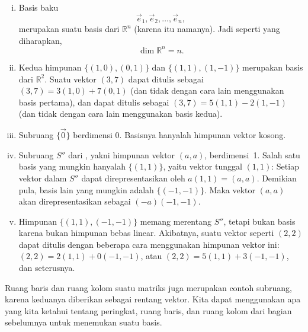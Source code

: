 \begin{example}
\begin{enumerate}[(i)]
\item
Basis baku
\begin{equation*}
\vec{e}_1, \vec{e}_2, \ldots, \vec{e}_n ,
\end{equation*}
merupakan suatu basis dari ${\mathbb R}^n$ (karena itu namanya).
Jadi seperti yang diharapkan,
\begin{equation*}
\dim {\mathbb R}^n = n .
\end{equation*}
\item
Kedua himpunan $\bigl\{ (1,0) , (0,1) \bigr\}$ dan
$\bigl\{ (1,1), (1,-1) \bigr\}$ merupakan
basis dari ${\mathbb{R}}^2$. Suatu vektor $(3,7)$ dapat
ditulis sebagai
$(3,7)=3 (1,0) + 7 (0,1)$
(dan tidak dengan cara lain menggunakan basis pertama),
dan dapat ditulis sebagai
$(3,7)=5 (1,1) - 2(1,-1)$
(dan tidak dengan cara lain menggunakan basis kedua).
\item
Subruang $\{ \vec{0} \}$ berdimensi $0$.
Basisnya hanyalah himpunan vektor kosong.
\item
Subruang $S''$ dari , yakni himpunan
vektor $(a,a)$, berdimensi~1. Salah satu basis yang mungkin hanyalah
$\bigl\{ (1,1) \bigr\}$, yaitu vektor tunggal
$(1,1)$: Setiap vektor dalam $S''$ dapat direpresentasikan oleh $a (1,1) =
(a,a)$. Demikian pula, basis lain yang mungkin adalah
$\bigl\{ (-1,-1) \bigr\}$. Maka
vektor $(a,a)$ akan direpresentasikan sebagai $(-a) (-1,-1)$.
\item
Himpunan $\bigl\{ (1,1) , (-1,-1) \bigr\}$ memang
merentang $S''$, tetapi bukan basis karena bukan himpunan bebas linear.
Akibatnya, suatu vektor seperti $(2,2)$ dapat ditulis dengan beberapa
cara menggunakan himpunan vektor ini:
$(2,2) = 2(1,1) + 0 (-1,-1)$,
atau
$(2,2) = 5(1,1) + 3 (-1,-1)$, dan seterusnya.
\end{enumerate}
\end{example}

Ruang baris dan ruang kolom suatu matriks juga merupakan contoh
subruang,
karena keduanya diberikan sebagai rentang vektor.
Kita dapat menggunakan
apa yang kita ketahui tentang peringkat, ruang baris, dan ruang kolom
dari bagian sebelumnya untuk menemukan suatu basis.

